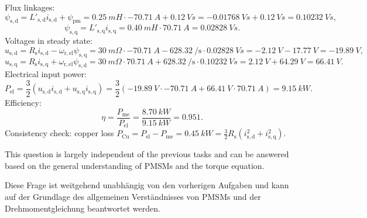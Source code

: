 \begin{solutionblock}
	Flux linkages:
	\[
		\psi_{\mathrm{s,d}} = L'_{\mathrm{s,d}} i_{\mathrm{s,d}} + \psi_{\mathrm{pm}}
		= \SI{0.25}{mH}\cdot \SI{-70.71}{A} + \SI{0.12}{Vs}
		= \SI{-0.01768}{Vs}+\SI{0.12}{Vs}=\SI{0.10232}{Vs},
	\]
	\[
		\psi_{\mathrm{s,q}} = L'_{\mathrm{s,q}} i_{\mathrm{s,q}}
		= \SI{0.40}{mH}\cdot \SI{70.71}{A}
		= \SI{0.02828}{Vs}.
	\]
	Voltages in steady state:
	\[
		u_{\mathrm{s,d}} = R_{\mathrm{s}} i_{\mathrm{s,d}} - \omega_{\mathrm{r,el}} \psi_{\mathrm{s,q}}
		= \SI{30}{m\Omega}\cdot \SI{-70.71}{A} - \SI{628.32}{\per\second}\cdot \SI{0.02828}{Vs}
		= \SI{-2.12}{V}-\SI{17.77}{V}=\SI{-19.89}{V},
	\]
	\[
		u_{\mathrm{s,q}} = R_{\mathrm{s}} i_{\mathrm{s,q}} + \omega_{\mathrm{r,el}} \psi_{\mathrm{s,d}}
		= \SI{30}{m\Omega}\cdot \SI{70.71}{A} + \SI{628.32}{\per\second}\cdot \SI{0.10232}{Vs}
		= \SI{2.12}{V}+\SI{64.29}{V}=\SI{66.41}{V}.
	\]
	Electrical input power:
	\[
		P_{\mathrm{el}}=\frac{3}{2}\left(u_{\mathrm{s,d}}i_{\mathrm{s,d}}+u_{\mathrm{s,q}}i_{\mathrm{s,q}}\right)
		=\frac{3}{2}\left(\SI{-19.89}{V}\cdot \SI{-70.71}{A}+\SI{66.41}{V}\cdot \SI{70.71}{A}\right)
		=\SI{9.15}{kW}.
	\]
	Efficiency:
	\[
		\eta=\frac{P_{\mathrm{me}}}{P_{\mathrm{el}}}=\frac{\SI{8.70}{kW}}{\SI{9.15}{kW}}=0.951.
	\]
	Consistency check: copper loss $P_{\mathrm{Cu}}=P_{\mathrm{el}}-P_{\mathrm{me}} = \SI{0.45}{kW} = \frac{3}{2}R_{\mathrm{s}}(i_{\mathrm{s,d}}^2+i_{\mathrm{s,q}}^2)$.
\end{solutionblock}

\begin{hintblock}
	This question is largely independent of the previous tasks and can be answered based on the general understanding of PMSMs and the torque equation.
\end{hintblock}


\begin{germanhintblock}
	Diese Frage ist weitgehend unabhängig von den vorherigen Aufgaben und kann auf der Grundlage des allgemeinen Verständnisses von PMSMs und der Drehmomentgleichung beantwortet werden.
\end{germanhintblock}

